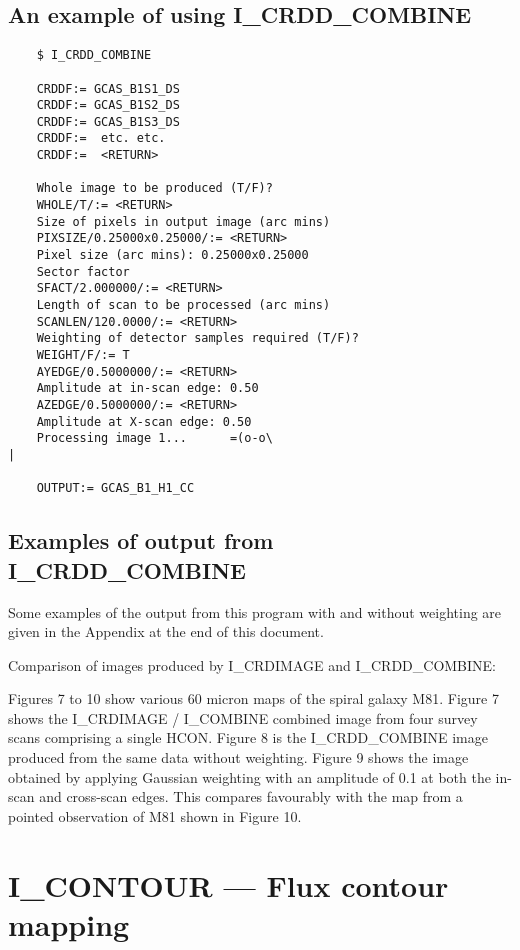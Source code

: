 \subsection{An example of using I\_CRDD\_COMBINE}

\begin{verbatim}
    $ I_CRDD_COMBINE

    CRDDF:= GCAS_B1S1_DS
    CRDDF:= GCAS_B1S2_DS
    CRDDF:= GCAS_B1S3_DS
    CRDDF:=  etc. etc.
    CRDDF:=  <RETURN>

    Whole image to be produced (T/F)?
    WHOLE/T/:= <RETURN>
    Size of pixels in output image (arc mins)
    PIXSIZE/0.25000x0.25000/:= <RETURN>
    Pixel size (arc mins): 0.25000x0.25000
    Sector factor
    SFACT/2.000000/:= <RETURN>
    Length of scan to be processed (arc mins)
    SCANLEN/120.0000/:= <RETURN>
    Weighting of detector samples required (T/F)?
    WEIGHT/F/:= T
    AYEDGE/0.5000000/:= <RETURN>
    Amplitude at in-scan edge: 0.50
    AZEDGE/0.5000000/:= <RETURN>
    Amplitude at X-scan edge: 0.50
    Processing image 1...      =(o-o\                                         |

    OUTPUT:= GCAS_B1_H1_CC
\end{verbatim}

\subsection{Examples of output from I\_CRDD\_COMBINE}

   Some examples of the output from this program with and without weighting
are given in the Appendix at the end of this document.

Comparison of images produced by I\_CRDIMAGE and I\_CRDD\_COMBINE:

Figures 7 to 10 show various 60 micron maps of the spiral galaxy M81.
Figure 7 shows the I\_CRDIMAGE / I\_COMBINE combined image from four survey
scans comprising a single HCON.
Figure 8 is the I\_CRDD\_COMBINE image produced from the same data without
weighting.
Figure 9 shows the image obtained by applying Gaussian weighting with an
amplitude of 0.1 at both the in-scan and cross-scan edges.
This compares favourably with the map from a pointed observation of M81 shown in
Figure 10.

\pagebreak

\section{I\_CONTOUR --- Flux contour mapping}

